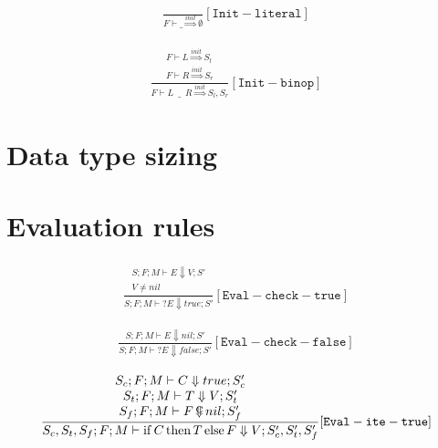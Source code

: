 \documentclass{scrartcl}
\DeclareMathOperator{\ifop}{if}
\DeclareMathOperator{\thenop}{then}
\DeclareMathOperator{\elseop}{else}
\DeclareMathOperator{\ceval}{\overset{C}{\smash{\Downarrow}}}
\begin{document}
    \begin{align*}
    \frac{}{
        F \vdash \_ \overset{init}{\Rightarrow} \emptyset
    }[\mathtt{Init-literal}]
    \end{align*}
    
    \begin{align*}
    \frac{
        \begin{matrix}
        F \vdash L \overset{init}{\Rightarrow} S_l \\
        F \vdash R \overset{init}{\Rightarrow} S_r
        \end{matrix}
    }{
        F \vdash L \enspace \_ \enspace R \overset{init}{\Rightarrow} S_l, S_r
    }[\mathtt{Init-binop}]
    \end{align*}
    
    \section{Data type sizing}
    
    

    \section{Evaluation rules}
    
    \begin{align*}
    \frac{
        \begin{matrix}
        S; F; M \vdash E \Downarrow V; S' \\
        V \neq nil
        \end{matrix}
    }{
        S; F; M \vdash ?E \Downarrow true; S'
    }[\mathtt{Eval-check-true}]
    \end{align*}
    
    \begin{align*}
    \frac{
        S; F; M \vdash E \Downarrow nil; S'
    }{
        S; F; M \vdash ?E \Downarrow false; S'
    }[\mathtt{Eval-check-false}]
    \end{align*}
    
    \begin{align*}
    \frac{
        \begin{matrix}
        S_c; F; M \vdash C \Downarrow true; S_c' \\
        S_t; F; M \vdash T \Downarrow V; S_t' \\
        S_f; F; M \vdash F \ceval nil; S_f'
        \end{matrix}
    }{
        S_c, S_t, S_f; F; M \vdash \ifop C \thenop T \elseop F \Downarrow V; S_c', S_t', S_f'
    }[\mathtt{Eval-ite-true}]
    \end{align*}
    
\end{document}
